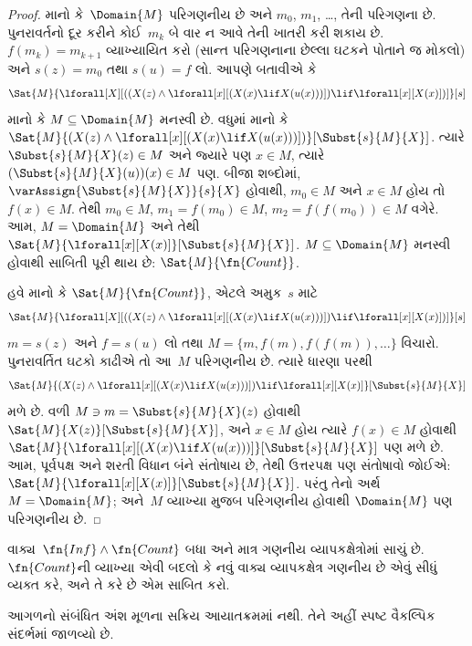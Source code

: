\begin{proof}
માનો કે~$\Domain{M}$ પરિગણનીય છે અને $m_0$, $m_1$, \dots,
તેની પરિગણના છે. પુનરાવર્તનો દૂર કરીને કોઈ~$m_k$ બે વાર ન આવે તેની
ખાતરી કરી શકાય છે. $f(m_k) = m_{k+1}$ વ્યાખ્યાયિત કરો (સાન્ત
પરિગણનાના છેલ્લા ઘટકને પોતાને જ મોકલો) અને $s(z) = m_0$ તથા
$s(u) = f$ લો. આપણે બતાવીએ કે
\[
\Sat{M}{\lforall[X][((X(z) \land \lforall[x][(X(x) \lif X(u(x)))])
    \lif \lforall[x][X(x)])]}[s]
\]
માનો કે $M \subseteq \Domain{M}$ મનસ્વી છે. વધુમાં માનો કે
$\Sat{M}{(X(z) \land \lforall[x][(X(x) \lif
X(u(x)))])}[\Subst{s}{M}{X}]$. ત્યારે
$\Subst{s}{M}{X}(z) \in M$ અને જ્યારે પણ $x \in M$, ત્યારે
$(\Subst{s}{M}{X}(u))(x) \in M$ પણ. બીજા શબ્દોમાં,
$\varAssign{\Subst{s}{M}{X}}{s}{X}$ હોવાથી, $m_0 \in M$ અને
$x \in M$ હોય તો $f(x) \in M$. તેથી $m_0 \in M$,
$m_1 = f(m_0) \in M$, $m_2 = f(f(m_0)) \in M$ વગેરે. આમ,
$M = \Domain{M}$ અને તેથી
$\Sat{M}{\lforall[x][X(x)]}[\Subst{s}{M}{X}]$. $M \subseteq
\Domain{M}$ મનસ્વી હોવાથી સાબિતી પૂરી થાય છે:
$\Sat{M}{\fn{Count}}$.

હવે માનો કે $\Sat{M}{\fn{Count}}$, એટલે અમુક~$s$ માટે
\[
\Sat{M}{\lforall[X][((X(z) \land \lforall[x][(X(x) \lif X(u(x)))])
    \lif \lforall[x][X(x)])]}[s]
\]
$m = s(z)$ અને $f = s(u)$ લો તથા
$M = \{m,
f(m), f(f(m)), \dots\}$ વિચારો. પુનરાવર્તિત ઘટકો કાઢીએ તો
આ~$M$ પરિગણનીય છે. ત્યારે ધારણા પરથી
\[
\Sat{M}{(X(z) \land \lforall[x][(X(x) \lif X(u(x)))] )
    \lif \lforall[x][X(x)]}[\Subst{s}{M}{X}]
\]
મળે છે. વળી $M \ni m =
\Subst{s}{M}{X}(z)$ હોવાથી $\Sat{M}{X(z)}[\Subst{s}{M}{X}]$,
અને $x \in M$ હોય ત્યારે $f(x) \in
M$ હોવાથી $\Sat{M}{\lforall[x][(X(x) \lif
X(u(x)))]}[\Subst{s}{M}{X}]$ પણ મળે છે. આમ, પૂર્વપક્ષ અને
શરતી વિધાન બંને સંતોષાય છે, તેથી ઉત્તરપક્ષ પણ સંતોષાવો જોઈએ:
$\Sat{M}{\lforall[x][X(x)]}[\Subst{s}{M}{X}]$. પરંતુ તેનો અર્થ
$M = \Domain{M}$; અને~$M$ વ્યાખ્યા મુજબ પરિગણનીય હોવાથી
$\Domain{M}$ પણ પરિગણનીય છે.
\end{proof}

\begin{prob}
વાક્ય~$\fn{Inf} \land \fn{Count}$ બધા અને માત્ર
ગણનીય વ્યાપકક્ષેત્રોમાં સાચું છે. $\fn{Count}$ની વ્યાખ્યા
એવી બદલો કે નવું વાક્ય વ્યાપકક્ષેત્ર ગણનીય છે એવું
સીધું વ્યક્ત કરે, અને તે કરે છે એમ સાબિત કરો.
\end{prob}
\endgroup


\OLEndChapterHook


\begin{editorial}
આગળનો સંબંધિત અંશ મૂળના સક્રિય આયાતક્રમમાં નથી. તેને અહીં સ્પષ્ટ વૈકલ્પિક સંદર્ભમાં જાળવ્યો છે.
\end{editorial}
\begingroup
\makeatletter{}\makeatother


